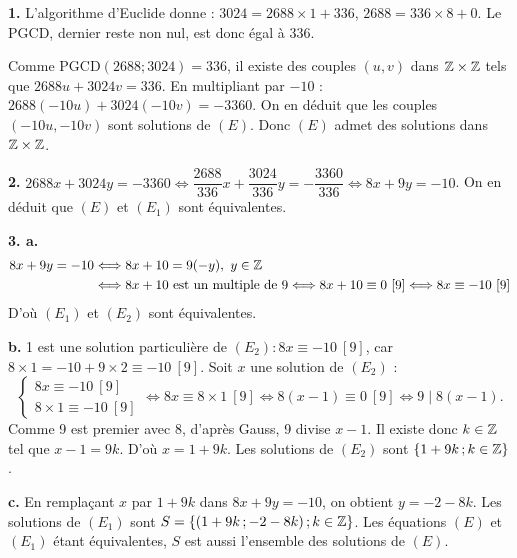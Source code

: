 \documentclass[11pt]{article}
\begin{document}


\textbf{1.} L'algorithme d'Euclide donne : $3024 = 2688 \times 1 + 336$, $2688 = 336 \times 8 + 0$. Le PGCD, dernier reste non nul, est donc égal à 336.

Comme $\mathrm{PGCD}(2688;3024) = 336$, il existe des couples $(u, v)$ dans $\mathbb{Z} \times \mathbb{Z}$ tels que $2688u + 3024v = 336$. En multipliant par $-10$ : $2688(-10u) + 3024(-10v) = -3360$. On en déduit que les couples $(-10u, -10v)$ sont solutions de $(E)$. Donc $(E)$ admet des solutions dans $\mathbb{Z} \times \mathbb{Z}$.

\textbf{2.} $2688x + 3024y = -3360 \Longleftrightarrow \dfrac{2688}{336}x + \dfrac{3024}{336}y = -\dfrac{3360}{336} \Longleftrightarrow 8x + 9y = -10$. On en déduit que $(E)$ et $(E_1)$ sont équivalentes.

\textbf{3. a.}
\begin{align*}
8x + 9y = -10 &\Longleftrightarrow 8x + 10 = 9(-y),\ y \in \mathbb{Z} \\
&\Longleftrightarrow 8x + 10 \text{ est un multiple de } 9 \Longleftrightarrow 8x + 10 \equiv 0\ [9] \Longleftrightarrow 8x \equiv -10\ [9]
\end{align*}
D'où $(E_1)$ et $(E_2)$ sont équivalentes.

\textbf{b.} 1 est une solution particulière de $(E_2) : 8x \equiv -10\ [9]$, car $8 \times 1 = -10 + 9 \times 2 \equiv -10\ [9]$. Soit $x$ une solution de $(E_2)$ :
\[ \begin{cases} 8x \equiv -10\ [9] \\ 8 \times 1 \equiv -10\ [9] \end{cases} \Longleftrightarrow 8x \equiv 8 \times 1\ [9] \Longleftrightarrow 8(x - 1) \equiv 0\ [9] \Longleftrightarrow 9 \mid 8(x - 1). \]
Comme 9 est premier avec 8, d'après Gauss, 9 divise $x - 1$. Il existe donc $k \in \mathbb{Z}$ tel que $x - 1 = 9k$. D'où $x = 1 + 9k$. Les solutions de $(E_2)$ sont $\{1 + 9k\,;k \in \mathbb{Z}\}$.

\textbf{c.} En remplaçant $x$ par $1 + 9k$ dans $8x + 9y = -10$, on obtient $y = -2 - 8k$. Les solutions de $(E_1)$ sont $S = \{(1 + 9k\,;-2 - 8k)\,;k \in \mathbb{Z}\}$. Les équations $(E)$ et $(E_1)$ étant équivalentes, $S$ est aussi l'ensemble des solutions de $(E)$.

\end{document}
